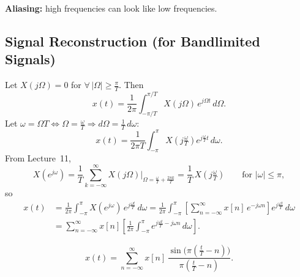 \documentclass[handout_subfiles_root.tex]{subfiles}
\begin{document}
\maketitle


\noindent\textbf{Aliasing:} high frequencies can look like low frequencies.

\subsection{Signal Reconstruction (for Bandlimited Signals)}

\noindent Let $X(j\Omega)=0$ for $\forall\,|\Omega|\ge\frac{\pi}{T}$. Then
\begin{equation*}
x(t) = \frac{1}{2\pi}\int_{-\pi/T}^{\pi/T} X(j\Omega)\,e^{j\Omega t}\,d\Omega.
\end{equation*}
Let $\omega=\Omega T \Leftrightarrow \Omega=\frac{\omega}{T} \Rightarrow d\Omega=\frac{1}{T}\,d\omega$:
\begin{equation*}
x(t) = \frac{1}{2\pi T}\int_{-\pi}^{\pi} X\!\left(j\tfrac{\omega}{T}\right) e^{j\frac{\omega}{T}t}\,d\omega.
\end{equation*}
From Lecture~11,
\begin{equation*}
X(e^{j\omega}) = \frac{1}{T}\sum_{k=-\infty}^{\infty} X(j\Omega)\Big|_{\Omega=\frac{\omega}{T}+\frac{2\pi k}{T}} = \frac{1}{T}\,X\!\left(j\tfrac{\omega}{T}\right) \qquad \text{for } |\omega|\le\pi,
\end{equation*}
so
\begin{align*}
x(t) &= \frac{1}{2\pi}\int_{-\pi}^{\pi} X(e^{j\omega})\,e^{j\frac{\omega t}{T}}\,d\omega
= \frac{1}{2\pi}\int_{-\pi}^{\pi}\left[\sum_{n=-\infty}^{\infty} x[n]\,e^{-j\omega n}\right] e^{j\frac{\omega t}{T}}\,d\omega \\
&= \sum_{n=-\infty}^{\infty} x[n]\left[\frac{1}{2\pi}\int_{-\pi}^{\pi} e^{j\frac{\omega t}{T}-j\omega n}\,d\omega\right].
\end{align*}

\begin{factbox}[title={Reconstruction formula}]
\begin{equation*}
x(t) = \sum_{n=-\infty}^{\infty} x[n]\,\frac{\sin\!\big(\pi(\frac{t}{T}-n)\big)}{\pi(\frac{t}{T}-n)}.
\end{equation*}
\end{factbox}
\end{document}
